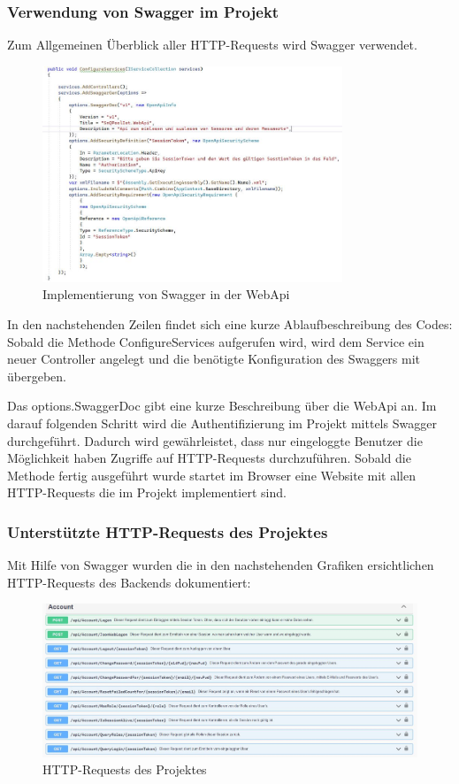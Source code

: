 \subsubsection*{Verwendung von Swagger im Projekt}
Zum Allgemeinen Überblick aller HTTP-Requests wird Swagger verwendet.

\begin{figure}[H]
    \centering
    \includegraphics[width=0.8\textwidth]{pics/SwaggerImplementation.JPG}
    \caption{Implementierung von Swagger in der WebApi}
\end{figure}

In den nachstehenden Zeilen findet sich eine kurze Ablaufbeschreibung des Codes:
Sobald die Methode ConfigureServices aufgerufen wird, wird dem Service ein neuer Controller angelegt und die benötigte Konfiguration des Swaggers mit übergeben. 

Das options.SwaggerDoc gibt eine kurze Beschreibung über die WebApi an.
Im darauf folgenden Schritt wird die Authentifizierung im Projekt mittels Swagger durchgeführt. Dadurch wird gewährleistet, dass nur eingeloggte Benutzer die Möglichkeit haben Zugriffe auf HTTP-Requests durchzuführen.
Sobald die Methode fertig ausgeführt wurde startet im Browser eine Website mit allen HTTP-Requests die im Projekt implementiert sind.

\subsubsection*{Unterstützte HTTP-Requests des Projektes}
Mit Hilfe von Swagger wurden die in den nachstehenden Grafiken ersichtlichen HTTP-Requests des Backends dokumentiert:

\begin{figure}[H]
    \flushleft
    \includegraphics[width=1.6\textwidth]{pics/WebApiRequests1.JPG}
    \caption{HTTP-Requests des Projektes}
\end{figure}

